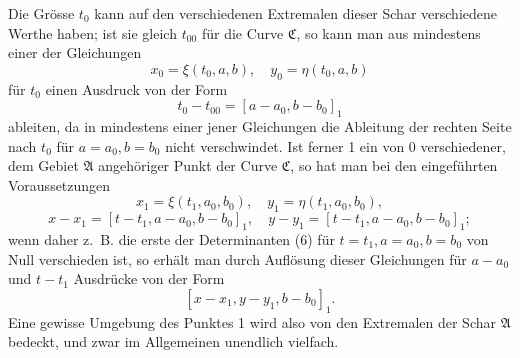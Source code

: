 \documentclass[11pt,a4paper,leqno]{article}
\begin{document}
Die Grösse $t_0$ kann auf den verschiedenen Extremalen dieser Schar verschiedene Werthe haben; ist sie gleich $t_{00}$ für die Curve $\mathfrak{C}$, so kann man aus mindestens einer der Gleichungen
\[
x_0=\xi(t_0,a,b),
\quad
 y_0=\eta(t_0,a,b)
\]
für $t_0$ einen Ausdruck von der Form
\[
t_0-t_{00}=[a-a_0,b-b_0]_1
\]
ableiten, da in mindestens einer jener Gleichungen die Ableitung der rechten Seite nach $t_0$ für $a=a_0,b=b_0$ nicht verschwindet. Ist ferner 1 ein von 0 verschiedener, dem Gebiet $\mathfrak{A}$ angehöriger Punkt der Curve $\mathfrak{C}$, so hat man bei den eingeführten Voraussetzungen
\[
x_1=\xi(t_1,a_0,b_0),
\quad
 y_1=\eta(t_1,a_0,b_0),
\]
\[
x-x_1=[t-t_1,a-a_0,b-b_0]_1,
\quad
 y-y_1=[t-t_1,a-a_0,b-b_0]_1;
\]
wenn daher z.~B. die erste der Determinanten (6) für $t=t_1,a=a_0,b=b_0$ von Null verschieden ist, so erhält man durch Auflösung dieser Gleichungen für $a-a_0$ und $t-t_1$ Ausdrücke von der Form
\[
[x-x_1,y-y_1,b-b_0]_1.
\]
Eine gewisse Umgebung des Punktes 1 wird also von den Extremalen der Schar $\mathfrak{A}$ bedeckt, und zwar im Allgemeinen unendlich vielfach.
\end{document}
